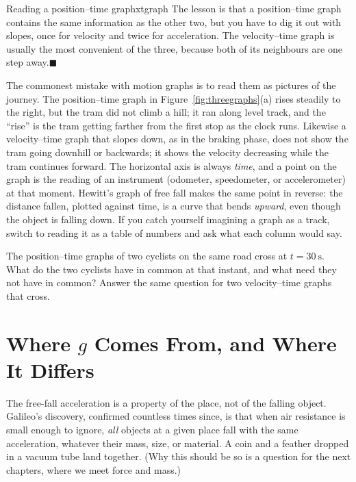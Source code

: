 \documentclass[11pt,twoside,openany]{book}
\newcounter{check}[chapter]
\newcommand{\qed}{\hfill$\blacksquare$}
\begin{document}
\begin{example}{Reading a position--time graph}{xtgraph}
The lesson is that a position--time graph contains the same information as the other two, but you have to dig it out with slopes, once for velocity and twice for acceleration. The velocity--time graph is usually the most convenient of the three, because both of its neighbours are one step away.\qed
\end{example}

\begin{modelnote}
The commonest mistake with motion graphs is to read them as pictures of the journey. The position--time graph in Figure~\ref{fig:threegraphs}(a) rises steadily to the right, but the tram did not climb a hill; it ran along level track, and the ``rise'' is the tram getting farther from the first stop as the clock runs. Likewise a velocity--time graph that slopes down, as in the braking phase, does not show the tram going downhill or backwards; it shows the velocity decreasing while the tram continues forward. The horizontal axis is always \emph{time}, and a point on the graph is the reading of an instrument (odometer, speedometer, or accelerometer) at that moment. Hewitt's graph of free fall makes the same point in reverse: the distance fallen, plotted against time, is a curve that bends \emph{upward}, even though the object is falling down. If you catch yourself imagining a graph as a track, switch to reading it as a table of numbers and ask what each column would say.
\end{modelnote}

\begin{checkbox}
The position--time graphs of two cyclists on the same road cross at $t = \SI{30}{\second}$. What do the two cyclists have in common at that instant, and what need they not have in common? Answer the same question for two velocity--time graphs that cross.
\end{checkbox}

\section{Where \texorpdfstring{$g$}{g} Comes From, and Where It Differs}

The free-fall acceleration is a property of the place, not of the falling object. Galileo's discovery, confirmed countless times since, is that when air resistance is small enough to ignore, \emph{all} objects at a given place fall with the same acceleration, whatever their mass, size, or material. A coin and a feather dropped in a vacuum tube land together. (Why this should be so is a question for the next chapters, where we meet force and mass.)
\end{document}
